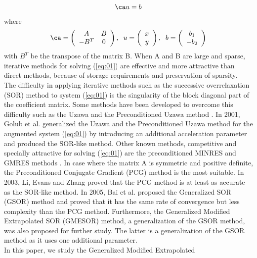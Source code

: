 \documentclass{report}
\begin{document}
\begin{equation}
\ca u=b\label{eq:01}
\end{equation}
where
\begin{equation}\label{eq:02}
\ca=\left(
\begin{array}{cc}
A & B\\
-B^{T} & 0
\end{array}
\right), \;\; u=
\left(
\begin{array}{cc}
x\\
y
\end{array}
\right),\;\; b=
\left(
\begin{array}{cc}
b_1\\
-b_2
\end{array}
\right)
\end{equation}
with $B^T$ be the transpose of the matrix B.
When A and B are large and sparse, iterative methods for solving
(\ref{eq:01}) are effective and more attractive than direct methods,
because of storage requirements and preservation of sparsity.
\\ \noindent The difficulty in applying iterative methods such as the
successive overrelaxation (SOR) method \cite{Young} to system
(\ref{eq:01}) is the singularity of the block diagonal part of the
coefficient matrix. Some methods have been developed to overcome this
difficulty such as the Uzawa and the Preconditioned Uzawa method
\cite{ArHurUz58}. In 2001, Golub et al. \cite{GolWuYuan2001} generalized
the Uzawa and the Preconditioned Uzawa method for the augmented system
(\ref{eq:01}) by introducing an additional acceleration parameter and
produced the SOR-like method. Other known methods, competitive and
specially attractive for solving (\ref{eq:01}) are the preconditioned
MINRES and GMRES methods \cite{FiRaSiWa98}. In case where the matrix A is
symmetric and positive definite, the Preconditioned Conjugate Gradient
(PCG) method \cite{HestSt52} is the most suitable. In 2003, Li, Evans and
Zhang \cite{LiEvansZha2003} proved that the PCG method is at least as
accurate as the SOR-like method. In 2005, Bai et al.
\cite{BaiParlWang2005} proposed the Generalized SOR (GSOR) method and
proved that it has the same rate of convergence but less complexity than
the PCG method. Furthermore, the Generalized Modified Extrapolated SOR
(GMESOR) method, a generalization of the GSOR method, was also proposed
for further study.
The latter is a generalization of the GSOR method as it uses one additional parameter. \\
\noindent In this paper, we study the Generalized Modified Extrapolated
\end{document}
